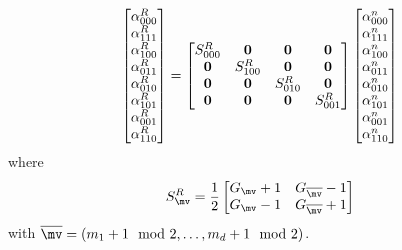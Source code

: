 \documentclass[12pt]{article}
\begin{document}
\[
  \left[\begin{matrix} \alpha_{000}^{R} \\ \alpha_{111}^{R}  \\ 
                       \alpha_{100}^{R}  \\ \alpha_{011}^{R} \\
                       \alpha_{010}^{R}  \\ \alpha_{101}^{R} \\
                       \alpha_{001}^{R}  \\ \alpha_{110}^{R}  \end{matrix}\right] 
 = 
  \left[\begin{matrix} S^R_{000} & {\mathbf 0} & {\mathbf 0} &  {\mathbf 0} \\
                        {\mathbf 0} & S^R_{100} & {\mathbf 0} & {\mathbf 0} \\
                        {\mathbf 0} & {\mathbf 0} & S^R_{010} & {\mathbf 0}  \\
                        {\mathbf 0} & {\mathbf 0} & {\mathbf 0} & S^R_{001}  \\
          \end{matrix}\right]
  \left[\begin{matrix} \alpha_{000}^{n} \\ \alpha_{111}^{n}  \\ 
                       \alpha_{100}^{n}  \\ \alpha_{011}^{n} \\
                       \alpha_{010}^{n}  \\ \alpha_{101}^{n} \\
                       \alpha_{001}^{n}  \\ \alpha_{110}^{n}  \end{matrix}\right] 
\]
where
\newcommand{\mvb}{{\overline{\mv}}}
\[ 
 S^R_\mv = {1\over 2}
   \left[\begin{matrix}
         G_\mv +1 &  G_{\mvb} -1 \\
         G_\mv -1 &  G_{\mvb} +1 \\
   \end{matrix}\right]
\]
with $\mvb = (m_1+1\mod2,\ldots,m_d+1\mod2)$.
\end{document}
